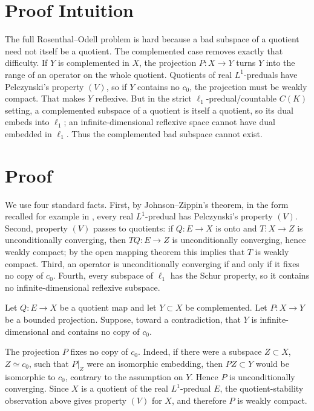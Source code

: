 \documentclass[11pt]{article}
\begin{document}
\section*{Proof Intuition}

The full Rosenthal--Odell problem is hard because a bad subspace of a quotient need not itself be a quotient.  The complemented case removes exactly that difficulty.  If \(Y\) is complemented in \(X\), the projection \(P:X\to Y\) turns \(Y\) into the range of an operator on the whole quotient.  Quotients of real \(L^1\)-preduals have Pelczynski's property \((V)\), so if \(Y\) contains no \(c_0\), the projection must be weakly compact.  That makes \(Y\) reflexive.  But in the strict \(\ell_1\)-predual/countable \(C(K)\) setting, a complemented subspace of a quotient is itself a quotient, so its dual embeds into \(\ell_1\); an infinite-dimensional reflexive space cannot have dual embedded in \(\ell_1\).  Thus the complemented bad subspace cannot exist.

\section*{Proof}

We use four standard facts.  First, by Johnson--Zippin's theorem, in the form recalled for example in \cite[Theorem 4.5]{Krulisova}, every real \(L^1\)-predual has Pelczynski's property \((V)\).  Second, property \((V)\) passes to quotients: if \(Q:E\to X\) is onto and \(T:X\to Z\) is unconditionally converging, then \(TQ:E\to Z\) is unconditionally converging, hence weakly compact; by the open mapping theorem this implies that \(T\) is weakly compact.  Third, an operator is unconditionally converging if and only if it fixes no copy of \(c_0\).  Fourth, every subspace of \(\ell_1\) has the Schur property, so it contains no infinite-dimensional reflexive subspace.

Let \(Q:E\to X\) be a quotient map and let \(Y\subset X\) be complemented.  Let \(P:X\to Y\) be a bounded projection.  Suppose, toward a contradiction, that \(Y\) is infinite-dimensional and contains no copy of \(c_0\).

The projection \(P\) fixes no copy of \(c_0\).  Indeed, if there were a subspace \(Z\subset X\), \(Z\simeq c_0\), such that \(P|_Z\) were an isomorphic embedding, then \(PZ\subset Y\) would be isomorphic to \(c_0\), contrary to the assumption on \(Y\).  Hence \(P\) is unconditionally converging.  Since \(X\) is a quotient of the real \(L^1\)-predual \(E\), the quotient-stability observation above gives property \((V)\) for \(X\), and therefore \(P\) is weakly compact.
\end{document}
